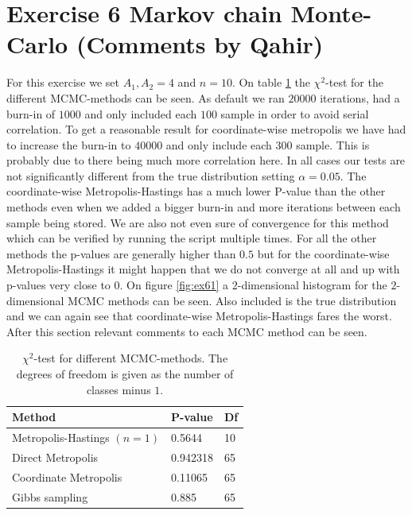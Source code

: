\section*{Exercise 6 Markov chain Monte-Carlo (Comments by Qahir)}
For this exercise we set $A_1,A_2=4$ and $n=10$. On table \ref{tab:tabex6} the $\chi^2$-test for the different MCMC-methods can be seen. As default we ran $20000$ iterations, had a burn-in of $1000$ and only included each $100$ sample in order to avoid serial correlation. To get a reasonable result for coordinate-wise metropolis we have had to increase the burn-in to $40000$ and only include each $300$ sample. This is probably due to there being much more correlation here. In all cases our tests are not significantly different from the true distribution setting $\alpha=0.05$. The coordinate-wise Metropolis-Hastings has a much lower P-value than the other methods even when we added a bigger burn-in and more iterations between each sample being stored. We are also not even sure of convergence for this method which can be verified by running the script multiple times. For all the other methods the p-values are generally higher than $0.5$ but for the coordinate-wise Metropolis-Hastings it might happen that we do not converge at all and up with p-values very close to $0$. On figure \ref{fig:ex61} a $2$-dimensional histogram for the $2$-dimensional MCMC methods can be seen. Also included is the true distribution and we can again see that coordinate-wise Metropolis-Hastings fares the worst. After this section relevant comments to each MCMC method can be seen. 
\begin{table}[H]
    \centering
    \begin{tabular}{|l|l|l|} \hline
        Method & P-value & Df  \\ \hline
        Metropolis-Hastings $(n=1)$& 0.5644  & 10 \\ \hline
        Direct Metropolis & 0.942318 & 65 \\ \hline
        Coordinate Metropolis & 0.11065 & 65 \\ \hline
        Gibbs sampling & 0.885 & 65\\ \hline
    \end{tabular}
    \caption{$\chi^2$-test for different MCMC-methods. The degrees of freedom is given as the number of classes minus $1$.}
    \label{tab:tabex6}
\end{table}

